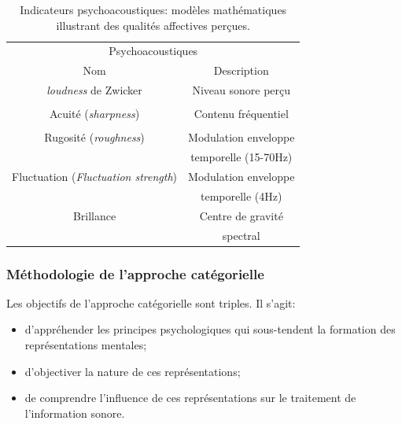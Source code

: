 \begin{table}[t]
\centering
\begin{tabular}{c c} 
\multicolumn{2}{c}{Psychoacoustiques} \\ 
Nom                           & Description            \\                      
\hline
\emph{loudness} de Zwicker                & Niveau sonore perçu     \\
                                          &         \\
Acuité (\emph{sharpness})                 & Contenu fréquentiel       \\
                                          &         \\
Rugosité (\emph{roughness})               & Modulation enveloppe        \\
                                          & temporelle (15-70Hz)       \\
Fluctuation (\emph{Fluctuation strength}) & Modulation enveloppe      \\
                                          & temporelle (4Hz)          \\
Brillance                                 & Centre de gravité       \\
                                          & spectral         \\                                       
\hline
\end{tabular}
\vspace{0.5mm}
\caption{Indicateurs psychoacoustiques: modèles mathématiques illustrant des qualités affectives perçues.}
\label{tab:psychoAcousIndi}
\end{table}


\subsubsection{Méthodologie de l'approche catégorielle}
\label{sec:ch3_appCategorielle}

Les objectifs de l'approche catégorielle sont triples. Il s'agit:

\begin{itemize}
\item d'appréhender les principes psychologiques qui sous-tendent la formation des représentations mentales;
\item d'objectiver la nature de ces représentations;
\item de comprendre l'influence de ces représentations sur le traitement de l'information sonore.
\end{itemize}
 
